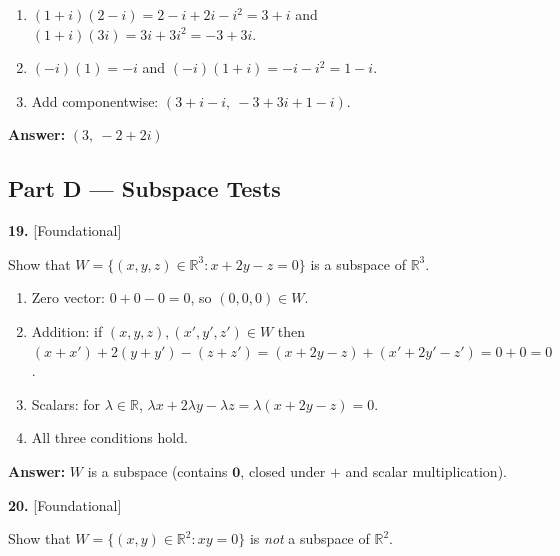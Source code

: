 \documentclass[11pt]{article}
\begin{document}
\begin{tcolorbox}[breakable,colback=ans,colframe=ansb,boxrule=0.5pt,left=4pt,right=4pt,top=2pt,bottom=2pt]\begin{enumerate}[leftmargin=2.2em,itemsep=1pt,topsep=1pt,label=\textbf{Step \arabic*.}]\item $(1+i)(2-i)=2-i+2i-i^{2}=3+i$ and $(1+i)(3i)=3i+3i^{2}=-3+3i$.
\item $(-i)(1)=-i$ and $(-i)(1+i)=-i-i^{2}=1-i$.
\item Add componentwise: $(3+i-i,\ -3+3i+1-i)$.
\end{enumerate}\textbf{Answer:} $(3,\ -2+2i)$\end{tcolorbox}
\par\vspace{2pt}
\subsection*{\normalsize\color{ink} Part D --- Subspace Tests}
\begin{minipage}{\linewidth}\textbf{19.} \hfill{\scriptsize\color{ink}[Foundational]}\par\nopagebreak Show that $W=\{(x,y,z)\in\mathbb{R}^{3}: x+2y-z=0\}$ is a subspace of $\mathbb{R}^{3}$.
\end{minipage}\par\nopagebreak
\begin{tcolorbox}[breakable,colback=ans,colframe=ansb,boxrule=0.5pt,left=4pt,right=4pt,top=2pt,bottom=2pt]\begin{enumerate}[leftmargin=2.2em,itemsep=1pt,topsep=1pt,label=\textbf{Step \arabic*.}]\item Zero vector: $0+0-0=0$, so $(0,0,0)\in W$.
\item Addition: if $(x,y,z),(x',y',z')\in W$ then $(x+x')+2(y+y')-(z+z')=(x+2y-z)+(x'+2y'-z')=0+0=0$.
\item Scalars: for $\lambda\in\mathbb{R}$, $\lambda x+2\lambda y-\lambda z=\lambda(x+2y-z)=0$.
\item All three conditions hold.
\end{enumerate}\textbf{Answer:} $W$ is a subspace (contains $\mathbf 0$, closed under $+$ and scalar multiplication).\end{tcolorbox}
\par\vspace{2pt}
\begin{minipage}{\linewidth}\textbf{20.} \hfill{\scriptsize\color{ink}[Foundational]}\par\nopagebreak Show that $W=\{(x,y)\in\mathbb{R}^{2}: xy=0\}$ is \emph{not} a subspace of $\mathbb{R}^{2}$.
\end{minipage}\par\nopagebreak
\end{document}

